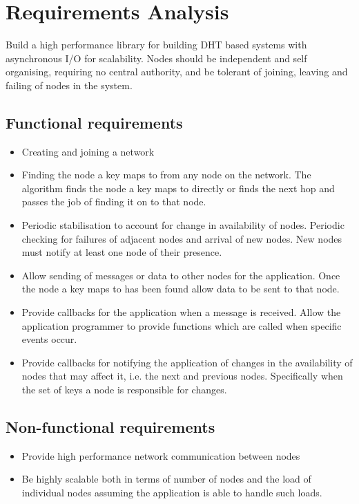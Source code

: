 \documentclass{article}
\begin{document}
\section{Requirements Analysis}
Build a high performance library for building DHT based systems with asynchronous I/O for scalability. Nodes should be independent and self organising, requiring no central authority, and be tolerant of joining, leaving and failing of nodes in the system.

\subsection{Functional requirements}
\begin{itemize}
\item
Creating and joining a network
\item
Finding the node a key maps to from any node on the network.
The algorithm finds the node a key maps to directly or finds the next hop and passes the job of finding it on to that node.
\item
Periodic stabilisation to account for change in availability of nodes.
Periodic checking for failures of adjacent nodes and arrival of new nodes. New nodes must notify at least one node of their presence.
\item
Allow sending of messages or data to other nodes for the application.
Once the node a key maps to has been found allow data to be sent to that node.
\item
Provide callbacks for the application when a message is received.
Allow the application programmer to provide functions which are called when specific events occur.
\item
Provide callbacks for notifying the application of changes in the availability of nodes that may affect it, i.e. the next and previous nodes. Specifically when the set of keys a node is responsible for changes.
\end{itemize}


\subsection{Non-functional requirements}
\begin{itemize}
\item
Provide high performance network communication between nodes
\item
Be highly scalable both in terms of number of nodes and the load of individual nodes assuming the application is able to handle such loads.
\end{itemize}
\end{document}
